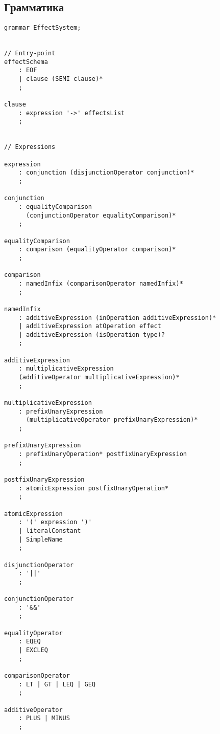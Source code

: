 \begin{appendices}

\section{Грамматика}

\label{appendix-es-grammar}

\begin{multicols}{2}
\begin{verbatim}
grammar EffectSystem;


// Entry-point
effectSchema
    : EOF
    | clause (SEMI clause)*
    ;

clause
    : expression '->' effectsList
    ;


// Expressions

expression
    : conjunction (disjunctionOperator conjunction)*
    ;

conjunction
    : equalityComparison
      (conjunctionOperator equalityComparison)*
    ;

equalityComparison
    : comparison (equalityOperator comparison)*
    ;

comparison
    : namedInfix (comparisonOperator namedInfix)*
    ;

namedInfix
    : additiveExpression (inOperation additiveExpression)*
    | additiveExpression atOperation effect
    | additiveExpression (isOperation type)?
    ;

additiveExpression
    : multiplicativeExpression
    (additiveOperator multiplicativeExpression)*
    ;

multiplicativeExpression
    : prefixUnaryExpression
      (multiplicativeOperator prefixUnaryExpression)*
    ;

prefixUnaryExpression
    : prefixUnaryOperation* postfixUnaryExpression
    ;

postfixUnaryExpression
    : atomicExpression postfixUnaryOperation*
    ;

atomicExpression
    : '(' expression ')'
    | literalConstant
    | SimpleName
    ;

disjunctionOperator
    : '||'
    ;

conjunctionOperator
    : '&&'
    ;

equalityOperator
    : EQEQ
    | EXCLEQ
    ;

comparisonOperator
    : LT | GT | LEQ | GEQ
    ;

additiveOperator
    : PLUS | MINUS
    ;


\end{verbatim}
\end{multicols}
\end{appendices}

